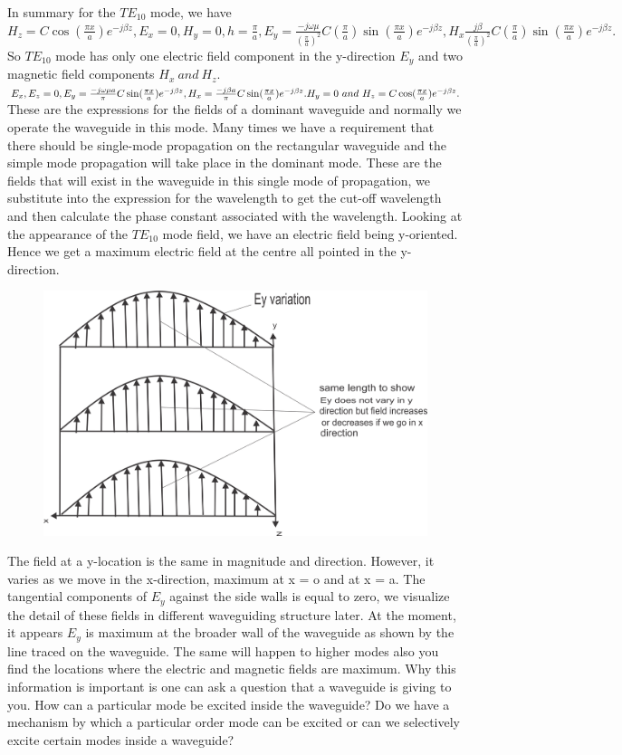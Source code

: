 In summary for the $TE_{10}$ mode, we have $H_z = C\cos(\frac{\pi x}{a})e^{-j\beta z}, E_x = 0, H_y = 0, h = \frac{\pi}{a}, E_y = 	\frac{-j\omega\mu }{(\frac{\pi}{a})^2}C(\frac{\pi}{a})\sin(\frac{\pi x}{a})e^{-j\beta z}, H_x \frac{j\beta}{(\frac{\pi}{a})^2}C(\frac{\pi}{a})\sin(\frac{\pi x}{a})e^{-j\beta z}.$ So $TE_{10}$ mode has only one electric field component in the y-direction $E_y$ and two magnetic field components $H_x\ and\ H_z$. $E_x, E_z = 0, E_y = \frac{-j\omega\mu a}{\pi}C\sin(\frac{\pi x}{a})e^{-j\beta z}, H_x = \frac{-j\beta a}{\pi}C\sin(\frac{\pi x}{a})e^{-j\beta z}.\\ H_y = 0\ and\ H_z = C\cos(\frac{\pi x}{a})e^{-j\beta z}.$ These are the expressions for the fields of a dominant waveguide and normally we operate the waveguide in this mode. Many times we have a requirement that there should be single-mode propagation on the rectangular waveguide and the simple mode propagation will take place in the dominant mode. These are the fields that will exist in the waveguide in this single mode of propagation, we substitute into the expression for the wavelength to get the cut-off wavelength and then calculate the phase constant associated with the wavelength. Looking at the appearance of the $TE_{10}$ mode field, we have an electric field being y-oriented. Hence we get a maximum electric field at the centre all pointed in the y-direction.
\begin{figure}[h]
\centering
\includegraphics[width=1\linewidth]{./graphics/group39-1}
\caption{}
\end{figure}
 The field at a y-location is the same in magnitude and direction. However, it varies as we move in the x-direction, maximum at x = o and at x = a. The tangential components of $E_y$ against the side walls is equal to zero, we visualize the detail of these fields in different waveguiding structure later. At the moment, it appears $E_y$ is maximum at the broader wall of the waveguide as shown by the line traced on the waveguide. The same will happen to higher modes also you find the locations where the electric and magnetic fields are maximum. Why this information is important is one can ask a question that a waveguide is giving to you. How can a particular mode be excited inside the waveguide? Do we have a mechanism by which a particular order mode can be excited or can we selectively excite certain modes inside a waveguide?
